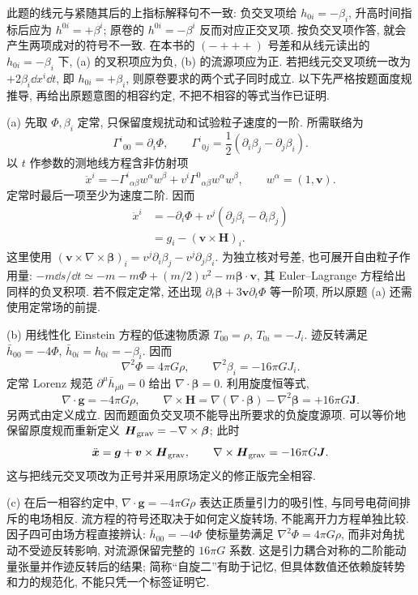 \begin{solution}
此题的线元与紧随其后的上指标解释句不一致: 负交叉项给 $h_{0i}=-\beta_i$, 升高时间指标后应为 $h^{0i}=+\beta^i$; 原卷的 $h^{0i}=-\beta^i$ 反而对应正交叉项. 按负交叉项作答, 就会产生两项成对的符号不一致. 在本书的 $(-+++)$ 号差和从线元读出的 $h_{0i}=-\beta_i$ 下, (a) 的叉积项应为负, (b) 的流源项应为正. 若把线元交叉项统一改为 $+2\beta_i\dd x^i\dd t$, 即 $h_{0i}=+\beta_i$, 则原卷要求的两个式子同时成立. 以下先严格按题面度规推导, 再给出原题意图的相容约定, 不把不相容的等式当作已证明.

(a) 先取 $\Phi,\beta_i$ 定常, 只保留度规扰动和试验粒子速度的一阶. 所需联络为
\[
\Gamma^i{}_{00}=\partial_i\Phi,\qquad
\Gamma^i{}_{0j}=\frac12(\partial_i\beta_j-\partial_j\beta_i).
\]
以 $t$ 作参数的测地线方程含非仿射项
\[
\ddot x^i=-\Gamma^i{}_{\alpha\beta}w^\alpha w^\beta
+v^i\Gamma^0{}_{\alpha\beta}w^\alpha w^\beta,
\qquad w^\alpha=(1,\boldsymbol v).
\]
定常时最后一项至少为速度二阶. 因而
\begin{align*}
\ddot x^i&=-\partial_i\Phi
+v^j(\partial_j\beta_i-\partial_i\beta_j)\\
&=g_i-(\boldsymbol v\times\boldsymbol H)_i.
\end{align*}
这里使用 $(\boldsymbol v\times\nabla\times\boldsymbol\beta)_i=v^j\partial_i\beta_j-v^j\partial_j\beta_i$. 为独立核对号差, 也可展开自由粒子作用量: $-m\dd s/\dd t\simeq-m-m\Phi+(m/2)v^2-m\boldsymbol\beta\cdot\boldsymbol v$, 其 Euler--Lagrange 方程给出同样的负叉积项. 若不假定定常, 还出现 $\partial_t\boldsymbol\beta+3\boldsymbol v\partial_t\Phi$ 等一阶项, 所以原题 (a) 还需使用定常场的前提.

(b) 用线性化 Einstein 方程的低速物质源 $T_{00}=\rho$, $T_{0i}=-J_i$. 迹反转满足 $\bar h_{00}=-4\Phi$, $\bar h_{0i}=h_{0i}=-\beta_i$. 因而
\[
\nabla^2\Phi=4\pi G\rho,\qquad
\nabla^2\beta_i=-16\pi GJ_i.
\]
定常 Lorenz 规范 $\partial^\mu\bar h_{\mu0}=0$ 给出 $\nabla\cdot\boldsymbol\beta=0$. 利用旋度恒等式,
\[
\nabla\cdot\boldsymbol g=-4\pi G\rho,\qquad
\nabla\times\boldsymbol H
=\nabla(\nabla\cdot\boldsymbol\beta)-\nabla^2\boldsymbol\beta
=+16\pi G\boldsymbol J.
\]
另两式由定义成立. 因而题面负交叉项不能导出所要求的负旋度源项. 可以等价地保留原度规而重新定义 $\boldsymbol H_{\rm grav}=-\nabla\times\boldsymbol\beta$; 此时
\[
\ddot{\boldsymbol x}=\boldsymbol g+\boldsymbol v\times\boldsymbol H_{\rm grav},
\qquad
\nabla\times\boldsymbol H_{\rm grav}=-16\pi G\boldsymbol J.
\]
这与把线元交叉项改为正号并采用原场定义的修正版完全相容.

(c) 在后一相容约定中, $\nabla\cdot\boldsymbol g=-4\pi G\rho$ 表达正质量引力的吸引性, 与同号电荷间排斥的电场相反. 流方程的符号还取决于如何定义旋转场, 不能离开力方程单独比较. 因子四可由场方程直接辨认: $\bar h_{00}=-4\Phi$ 使标量势满足 $\nabla^2\Phi=4\pi G\rho$, 而非对角扰动不受迹反转影响, 对流源保留完整的 $16\pi G$ 系数. 这是引力耦合对称的二阶能动量张量并作迹反转后的结果; 简称“自旋二”有助于记忆, 但具体数值还依赖旋转势和力的规范化, 不能只凭一个标签证明它.
\end{solution}

